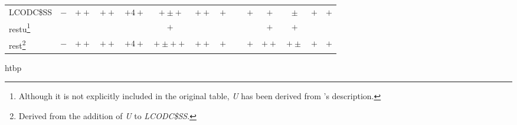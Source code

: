 {\begin{tabular}{lccccccccccccc}
    \hline
    LCODC\$SS & $-$ & $++$ & $++$ & $+4+$ & $+\pm+$ & $++$ & $+$ & ~ & $+$ & $+$ & $\pm$ & $+$ & $+$ \\
    \acs{restu}\footnote{Although it is not explicitly included in the original table, \emph{U} has been derived from \citeauthor{fielding_architectural_2000}'s description.}
      & ~ & ~ & ~ & ~ & $+$ & ~ & ~ & ~ & ~ & $+$ & $+$ & ~ & ~ \\ %
    \hline
    \acs{rest}\footnote{Derived from the addition of \emph{U} to \emph{LCODC\$SS}.} %
      & $-$ & $++$ & $++$ & $+4+$ & $+\pm++$ & $++$ & $+$ & ~ & $+$ & $++$ & $+\pm$ & $+$ & $+$ \\ %
    \hline
  \end{tabular}
}{htbp}